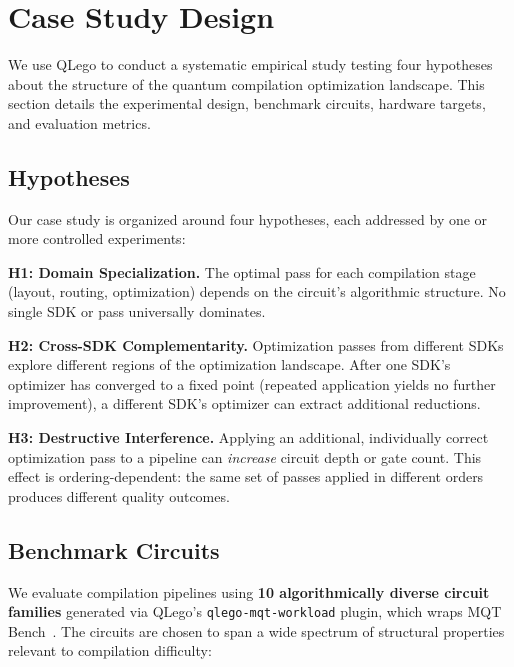 \documentclass[conference]{IEEEtran}
\begin{document}
\section{Case Study Design}
\label{sec:casestudy}

We use QLego to conduct a systematic empirical study testing four hypotheses about the structure of the quantum compilation optimization landscape.
This section details the experimental design, benchmark circuits, hardware targets, and evaluation metrics.

\subsection{Hypotheses}

Our case study is organized around four hypotheses, each addressed by one or more controlled experiments:

\textbf{H1: Domain Specialization.}
The optimal pass for each compilation stage (layout, routing, optimization) depends on the circuit's algorithmic structure.
No single SDK or pass universally dominates.

\textbf{H2: Cross-SDK Complementarity.}
Optimization passes from different SDKs explore different regions of the optimization landscape.
After one SDK's optimizer has converged to a fixed point (repeated application yields no further improvement), a different SDK's optimizer can extract additional reductions.

\textbf{H3: Destructive Interference.}
Applying an additional, individually correct optimization pass to a pipeline can \textit{increase} circuit depth or gate count.
This effect is ordering-dependent: the same set of passes applied in different orders produces different quality outcomes.

\subsection{Benchmark Circuits}
\label{subsec:circuits}

We evaluate compilation pipelines using \textbf{10 algorithmically diverse circuit families} generated via QLego's \texttt{qlego-mqt-workload} plugin, which wraps MQT Bench~\cite{quetschlich2023mqtbench}.
The circuits are chosen to span a wide spectrum of structural properties relevant to compilation difficulty:
\end{document}
